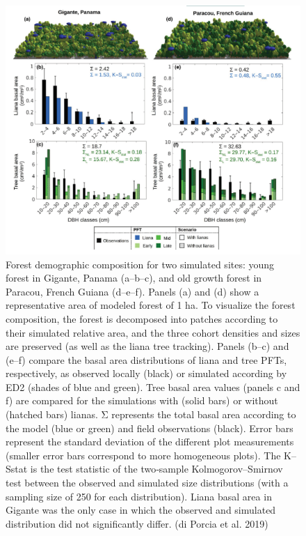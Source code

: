 \documentclass[12pt,oneside]{book}
\begin{document}
\begin{figure}

{\centering \includegraphics[width=0.8\linewidth]{figures/chap7/f723_porcia2} 

}

\caption{Forest demographic composition for two simulated sites: young forest in Gigante, Panama (a–b–c), and old growth forest in Paracou, French Guiana (d–e–f). Panels (a) and (d) show a representative area of modeled forest of 1 ha. To visualize the forest composition, the forest is decomposed into patches according to their simulated relative area, and the three cohort densities and sizes are preserved (as well as the liana tree tracking). Panels (b–c) and (e–f) compare the basal area distributions of liana and tree PFTs, respectively, as observed locally (black) or simulated according by ED2 (shades of blue and green). Tree basal area values (panels c and f) are compared for the simulations with (solid bars) or without (hatched bars) lianas. Σ represents the total basal area according to the model (blue or green) and field observations (black). Error bars represent the standard deviation of the different plot measurements (smaller error bars correspond to more homogeneous plots). The K–Sstat is the test statistic of the two‐sample Kolmogorov–Smirnov test between the observed and simulated size distributions (with a sampling size of 250 for each distribution). Liana basal area in Gigante was the only case in which the observed and simulated distribution did not significantly differ. (di Porcia et al. 2019)}\label{fig:f723}
\end{figure}
\end{document}
